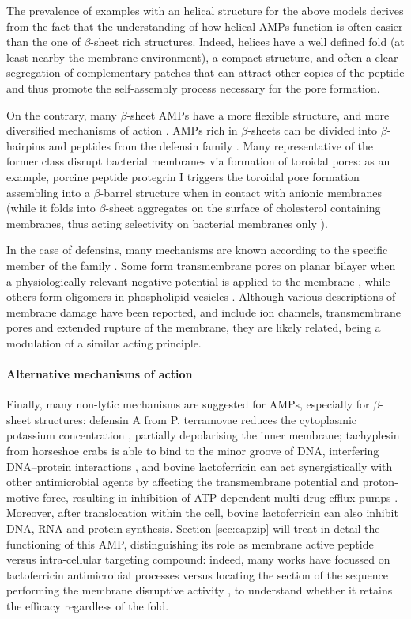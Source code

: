 The prevalence of examples with an helical structure for the above models derives from the fact that the understanding of how helical AMPs function is often easier than the one of $\beta$-sheet rich structures.
%
Indeed, helices have a well defined fold (at least nearby the membrane environment), a compact structure, and often a clear segregation of complementary patches that can attract other copies of the peptide and thus promote the self-assembly process necessary for the pore formation.

On the contrary, many $\beta$-sheet AMPs have a more flexible structure, and more diversified mechanisms of action \cite{??}.
%
AMPs rich in $\beta$-sheets can be divided into $\beta$-hairpins and peptides from the defensin family \cite{Nguyen2011}.
%
Many representative of the former class disrupt bacterial membranes via formation of toroidal pores: as an example, porcine peptide protegrin I triggers the toroidal pore formation assembling into a $\beta$-barrel structure when in contact with anionic membranes (while it folds into $\beta$-sheet aggregates on the surface of cholesterol containing membranes, thus acting selectivity on bacterial membranes only \cite{Tang2009}).

In the case of defensins, many mechanisms are known according to the specific member of the family \cite{Lehrer2004}.
%
Some form transmembrane pores on planar bilayer when a physiologically relevant negative potential is applied to the membrane \cite{Kagan1990}, while others form oligomers in phospholipid vesicles \cite{Takeuchi2004}.
%
Although various descriptions of membrane damage have been reported, and include ion channels, transmembrane pores and extended rupture of the membrane, they are likely related, being a modulation of a similar acting principle.


\paragraph{Alternative mechanisms of action} Finally, many non-lytic mechanisms are suggested for AMPs, especially for $\beta$-sheet structures: defensin A from P. terramovae reduces the cytoplasmic potassium concentration \cite{Brogden2005}, partially depolarising the inner membrane; tachyplesin from horseshoe crabs is able to bind to the minor groove of DNA, interfering DNA–protein interactions \cite{Yonezawa1992},
%
and bovine lactoferricin can act synergistically with other antimicrobial agents by affecting the transmembrane potential and proton-motive force, resulting in inhibition of ATP-dependent multi-drug efflux pumps \cite{Gifford2005}.
%
Moreover, after translocation within the cell, bovine lactoferricin can also inhibit DNA, RNA and protein synthesis. Section \ref{sec:capzip} will treat in detail the functioning of this AMP, distinguishing its role as membrane active peptide versus intra-cellular targeting compound: indeed, many works have focussed on lactoferricin antimicrobial processes versus locating the section of the sequence performing the membrane disruptive activity \cite{Tomita1994,Schibli1999}, to understand whether it retains the efficacy regardless of the fold.

